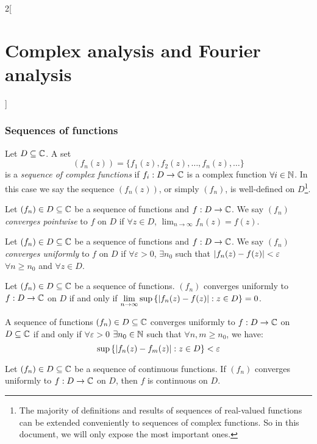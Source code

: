 \documentclass[../../../main.tex]{subfiles}
\begin{document}
\begin{multicols}{2}[\section{Complex analysis and Fourier analysis}]
  \subsubsection{Sequences of functions}
  \begin{definition}
    Let $D\subseteq\mathbb{C}$. A set $$(f_n(z))=\{f_1(z),f_2(z),\ldots,f_n(z),\ldots\}$$ is a \emph{sequence of complex functions} if $f_i:D\rightarrow\mathbb{C} $ is a complex function $\forall i\in\mathbb{N}$. In this case we say the sequence $(f_n(z))$, or simply $(f_n)$, is well-defined on $D$\footnote{The majority of definitions and results of sequences of real-valued functions can be extended conveniently to sequences of complex functions. So in this document, we will only expose the most important ones.}.
  \end{definition}
  \begin{definition}
    Let $(f_n)\in D\subseteq\mathbb{C}$ be a sequence of functions and $f:D\rightarrow\mathbb{C}$. We say $(f_n)$ \emph{converges pointwise} to $f$ on $D$ if $\forall z\in D$, $\displaystyle\lim_{n\to\infty}f_n(z)=f(z)$.
  \end{definition}
  \begin{definition}
    Let $(f_n)\in D\subseteq\mathbb{C}$ be a sequence of functions and $f:D\rightarrow\mathbb{C}$. We say $(f_n)$ \emph{converges uniformly} to $f$ on $D$ if $\forall\varepsilon>0$, $\exists n_0$ such that $\abs{f_n(z)-f(z)}<\varepsilon$ $\forall n\geq n_0$ and $\forall z\in D$.
  \end{definition}
  \begin{lemma}
    Let $(f_n)\in D\subseteq\mathbb{C}$ be a sequence of functions. $(f_n)$ converges uniformly to $f:D\rightarrow\mathbb{C}$ on $D$ if and only if $\displaystyle \lim_{n\to\infty}\sup\left\{\abs{f_n(z)-f(z)}:z\in D\right\}=0$.
  \end{lemma}
  \begin{theorem}
    A sequence of functions $(f_n)\in D\subseteq\mathbb{C}$ converges uniformly to $f:D\rightarrow\mathbb{C}$ on $D\subseteq\mathbb{C}$ if and only if $\forall\varepsilon>0$ $\exists n_0\in\mathbb{N}$ such that  $\forall n,m\geq n_0$, we have: $$\sup\left\{\abs{f_n(z)-f_m(z)}:z\in D\right\}< \varepsilon$$
  \end{theorem}
  \begin{theorem}
    Let $(f_n)\in D\subseteq\mathbb{C}$ be a sequence of continuous functions. If $(f_n)$ converges uniformly to $f:D\rightarrow\mathbb{C}$ on $D$, then $f$ is continuous on $D$.
  \end{theorem}

\end{multicols}
\end{document}
